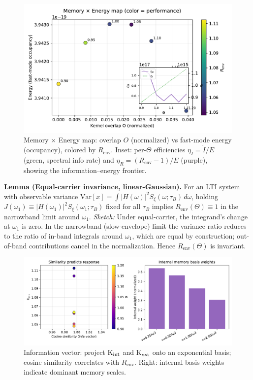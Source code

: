 \documentclass[11pt,letterpaper]{article}
\begin{document}
\begin{figure}[t]
\centering
\includegraphics[width=0.8\linewidth]{figI_memory_energy.pdf}
\caption{Memory $\times$ Energy map: overlap $O$ (normalized) vs fast-mode energy (occupancy), colored by $R_{\mathrm{env}}$. Inset: per-$\Theta$ efficiencies $\eta_I=\dot I/E$ (green, spectral info rate) and $\eta_R=(R_{\mathrm{env}}-1)/E$ (purple), showing the information--energy frontier.}
\end{figure}

\begin{tcolorbox}
\textbf{Lemma (Equal-carrier invariance, linear-Gaussian).} For an LTI system with observable variance $\mathrm{Var}[x]=\int |H(\omega)|^2 S_\xi(\omega;\tau_B)\,d\omega$, holding $J(\omega_1)\equiv |H(\omega_1)|^2 S_\xi(\omega_1;\tau_B)$ fixed for all $\tau_B$ implies $R_{\mathrm{env}}(\Theta)\equiv 1$ in the narrowband limit around $\omega_1$. \emph{Sketch:} Under equal-carrier, the integrand's change at $\omega_1$ is zero. In the narrowband (slow-envelope) limit the variance ratio reduces to the ratio of in-band integrals around $\omega_1$, which are equal by construction; out-of-band contributions cancel in the normalization. Hence $R_{\mathrm{env}}(\Theta)$ is invariant.
\end{tcolorbox}

\begin{figure}[t]
\centering
\includegraphics[width=0.9\linewidth]{figJ_info_vector.pdf}
\caption{Information vector: project K$_{\rm int}$ and K$_{\rm ext}$ onto an exponential basis; cosine similarity correlates with $R_{\mathrm{env}}$. Right: internal basis weights indicate dominant memory scales.}
\end{figure}
\end{document}
